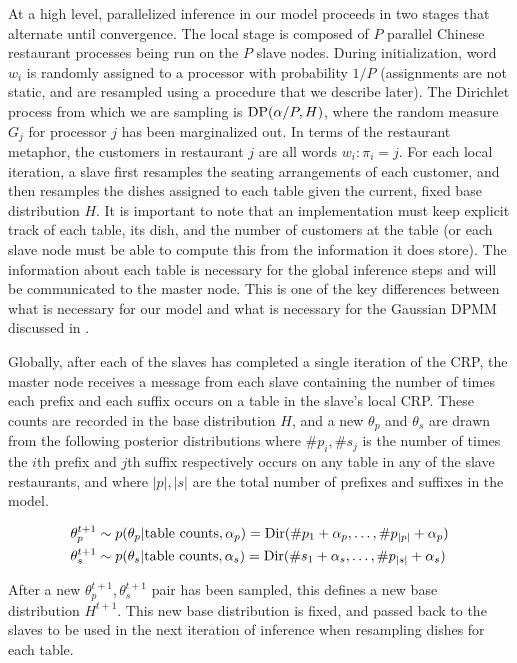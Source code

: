 At a high level, parallelized inference in our model proceeds in two
stages that alternate until convergence. The local stage is composed
of $P$ parallel Chinese restaurant processes being run on the $P$
slave nodes. During initialization, word $w_i$ is randomly assigned to
a processor with probability $1/P$ (assignments are not static, and
are resampled using a procedure that we describe later). The Dirichlet
process from which we are sampling is $\mathrm{DP}(\alpha/P, H)$, where the
random measure $G_j$ for processor $j$ has been marginalized out. In
terms of the restaurant metaphor, the customers in restaurant $j$ are
all words $w_i : {\pi_i = j}$. For each local iteration, a slave first
resamples the seating arrangements of each customer, and then
resamples the dishes assigned to each table given the current, fixed
base distribution $H$. It is important to note that an implementation
must keep explicit track of each table, its dish, and the number of
customers at the table (or each slave node must be able to compute
this from the information it does store). The information about each
table is necessary for the global inference steps and will be
communicated to the master node. This is one of the key differences
between what is necessary for our model and what is necessary for the
Gaussian DPMM discussed in \cite{williamson2013}.

Globally, after each of the slaves has completed a single iteration of
the CRP, the master node receives a message from each slave containing
the number of times each prefix and each suffix occurs on a table in
the slave's local CRP. These counts are recorded in the base
distribution $H$, and a new $\theta_p$ and $\theta_s$ are drawn from
the following posterior distributions where $\#p_i, \#s_j$ is the number of
times the $i$th prefix and $j$th suffix respectively occurs on any
table in any of the slave restaurants, and where $|p|, |s|$ are the
total number of prefixes and suffixes in the model.

\begin{align}
  \theta_p^{t+1} & \sim p(\theta_p | \text{table counts}, \alpha_p)
  = \mathrm{Dir}(\#p_1 + \alpha_p, \ldots, \#p_{|p|} + \alpha_p) \\
  \theta_s^{t+1} & \sim p(\theta_s | \text{table counts}, \alpha_s)
  = \mathrm{Dir}(\#s_1 + \alpha_s, \ldots, \#p_{|s|} + \alpha_s)
\end{align}

After a new $\theta_p^{t+1}, \theta_s^{t+1}$ pair has been sampled,
this defines a new base distribution $H^{t+1}$. This new base
distribution is fixed, and passed back to the slaves to be used in the
next iteration of inference when resampling dishes for each table.

